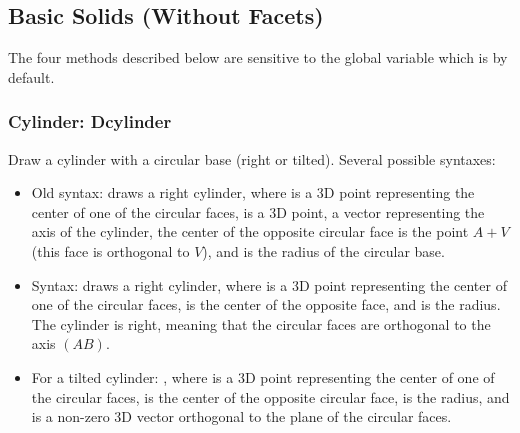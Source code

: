 \subsection{Basic Solids (Without Facets)}

The four methods described below are sensitive to the global variable  which is \false by default.

\subsubsection{Cylinder: Dcylinder}

Draw a cylinder with a circular base (right or tilted). Several possible syntaxes:
\begin{itemize}
    \item Old syntax:  draws a right cylinder, where  is a 3D point representing the center of one of the circular faces,  is a 3D point, a vector representing the axis of the cylinder, the center of the opposite circular face is the point $A+V$ (this face is orthogonal to $V$), and  is the radius of the circular base.

    \item Syntax:  draws a right cylinder, where  is a 3D point representing the center of one of the circular faces,  is the center of the opposite face, and  is the radius. The cylinder is right, meaning that the circular faces are orthogonal to the axis $(AB)$.

    \item For a tilted cylinder: , where  is a 3D point representing the center of one of the circular faces,  is the center of the opposite circular face,  is the radius, and  is a non-zero 3D vector orthogonal to the plane of the circular faces.
\end{itemize}

